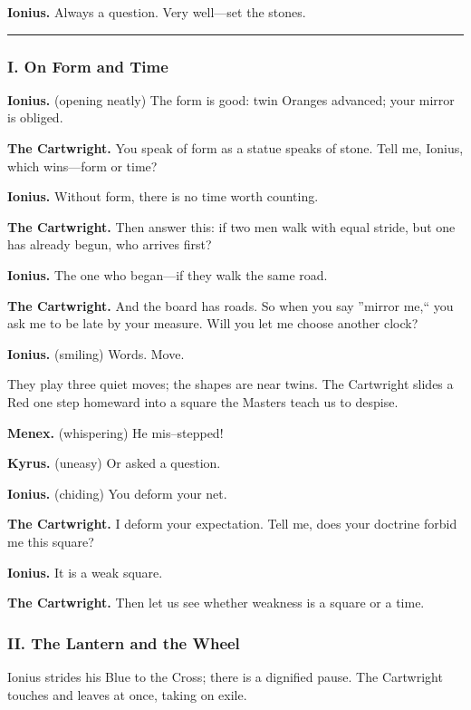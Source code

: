 \documentclass[11pt]{article}
\begin{document}
\noindent\textbf{Ionius.} Always a question. Very well---set the stones.

\medskip
\hrule
\medskip

\subsubsection*{I. On Form and Time}
\noindent\textbf{Ionius.} (opening neatly) The form is good: twin Oranges advanced; your mirror is obliged.

\noindent\textbf{The Cartwright.} You speak of form as a statue speaks of stone. Tell me, Ionius, which wins---form or time?

\noindent\textbf{Ionius.} Without form, there is no time worth counting.

\noindent\textbf{The Cartwright.} Then answer this: if two men walk with equal stride, but one has already begun, who arrives first?

\noindent\textbf{Ionius.} The one who began---if they walk the same road.

\noindent\textbf{The Cartwright.} And the board has roads. So when you say ''mirror me,`` you ask me to be late by your measure. Will you let me choose another clock?

\noindent\textbf{Ionius.} (smiling) Words. Move.

\medskip
They play three quiet moves; the shapes are near twins. The Cartwright slides a Red one step homeward into a square the Masters teach us to despise.

\noindent\textbf{Menex.} (whispering) He mis--stepped!

\noindent\textbf{Kyrus.} (uneasy) Or asked a question.

\noindent\textbf{Ionius.} (chiding) You deform your net.

\noindent\textbf{The Cartwright.} I deform your expectation. Tell me, does your doctrine forbid me this square?

\noindent\textbf{Ionius.} It is a weak square.

\noindent\textbf{The Cartwright.} Then let us see whether weakness is a square or a time.

\medskip
\subsubsection*{II. The Lantern and the Wheel}
Ionius strides his Blue to the Cross; there is a dignified pause. The Cartwright touches and leaves at once, taking on exile.
\end{document}
